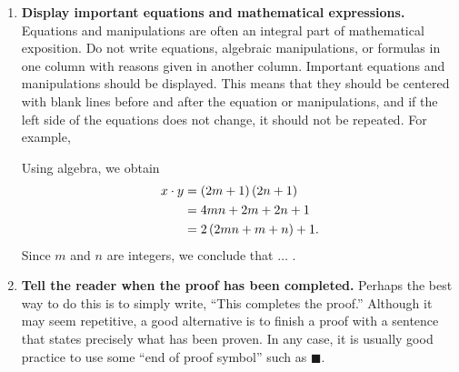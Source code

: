 \begin{enumerate}
%


\item \textbf{Display important equations and mathematical expressions.}
Equations and manipulations are often an integral part of mathematical exposition.  Do not write equations, algebraic manipulations, or formulas in one column with reasons given in another column. 
   Important equations and manipulations should be displayed.  This means that they should be centered with blank lines before and after the equation or manipulations, and if the left side of the equations does not change, it should not be repeated.  For example,

Using algebra, we obtain	
\begin{align}
  x \cdot y &= \left( {2m + 1} \right)\left( {2n + 1} \right)  \notag \\ 
            &= 4mn + 2m + 2n + 1  \notag \\ 
            &= 2\left( {2mn + m + n} \right) + 1.  \notag  
\end{align} 
Since  $m$  and  $n$  are integers, we conclude that $ \ldots $ .



\item \textbf{Tell the reader when the proof has been completed.}
Perhaps the best way to do this is to simply write, ``This completes the proof.''  Although it may seem repetitive, a good alternative is to finish a proof with a sentence that states precisely what has been proven.  In any case, it is usually good practice to use  some ``end of proof symbol'' such as  $\blacksquare$.
%


%
\end{enumerate}
\hbreak

